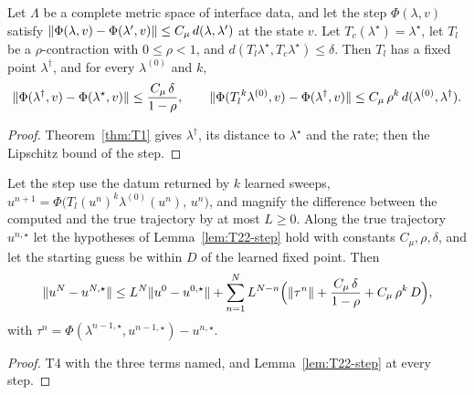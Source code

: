 \begin{lemma}\label{lem:T22-step}
  \leanok
  Let $\Lambda$ be a complete metric space of interface data, and let the step
  $\Phi(\lambda,v)$ satisfy
  $\lVert \Phi(\lambda,v)-\Phi(\lambda',v)\rVert\le C_\mu\,d(\lambda,\lambda')$ at
  the state $v$.  Let $T_c(\lambda^\star)=\lambda^\star$, let $T_l$ be a
  $\rho$-contraction with $0\le\rho<1$, and
  $d(T_l\lambda^\star,T_c\lambda^\star)\le\delta$.  Then $T_l$ has a fixed
  point $\lambda^\dagger$, and for every $\lambda^{(0)}$ and $k$,
  \[
    \lVert \Phi(\lambda^\dagger,v)-\Phi(\lambda^\star,v)\rVert\le\frac{C_\mu\,\delta}{1-\rho},
    \qquad
    \lVert \Phi(T_l^{\,k}\lambda^{(0)},v)-\Phi(\lambda^\dagger,v)\rVert
      \le C_\mu\,\rho^k\,d(\lambda^{(0)},\lambda^\dagger).
  \]
\end{lemma}

\begin{proof}
  \leanok
  Theorem~\ref{thm:T1} gives $\lambda^\dagger$, its distance to
  $\lambda^\star$ and the rate; then the Lipschitz bound of the step.
\end{proof}

\begin{theorem}[T22, tier 2]\label{thm:T22-tier2}
  \leanok
  Let the step use the datum returned by $k$ learned sweeps,
  $u^{n+1}=\Phi\bigl(T_l(u^n)^k\lambda^{(0)}(u^n),\,u^n\bigr)$, and magnify
  the difference between the computed and the true trajectory by at most
  $L\ge0$.  Along the true trajectory $u^{n,\star}$ let the hypotheses of
  Lemma~\ref{lem:T22-step} hold with constants $C_\mu,\rho,\delta$, and let
  the starting guess be within $D$ of the learned fixed point.  Then
  \[
    \lVert u^N-u^{N,\star}\rVert\le L^N\lVert u^0-u^{0,\star}\rVert
      +\sum_{n=1}^{N}L^{N-n}\Bigl(\lVert \tau^n\rVert
        +\frac{C_\mu\,\delta}{1-\rho}+C_\mu\,\rho^k\,D\Bigr),
  \]
  with $\tau^n=\Phi(\lambda^{n-1,\star},u^{n-1,\star})-u^{n,\star}$.
\end{theorem}

\begin{proof}
  \leanok
  T4 with the three terms named, and Lemma~\ref{lem:T22-step} at every step.
\end{proof}


